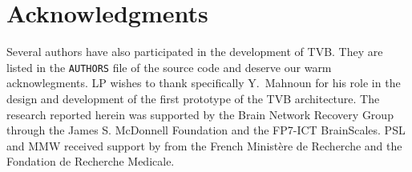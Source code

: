 \documentclass{bioinfo}
\begin{document}
\section*{Acknowledgments}
Several authors have also participated in the
development of TVB. They are listed in the \texttt{AUTHORS} file 
of the source code and deserve our warm acknowlegments. LP wishes to thank
specifically Y.~Mahnoun for his role in the design and development
of the first prototype of the TVB architecture. The research reported herein
was supported by the  Brain Network Recovery Group through the James S.
McDonnell Foundation and the FP7-ICT BrainScales. PSL and MMW received
support by from the French Minist\`{e}re de Recherche and the Fondation
de Recherche Medicale.



\end{document}
